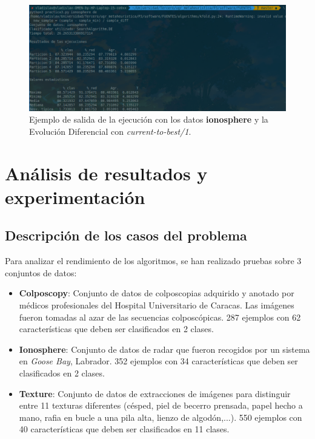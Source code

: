 \documentclass[11pt,a4paper]{article}
\begin{document}
\begin{figure}[H]
\centering
\includegraphics[scale=0.4]{img/out_example.png}
\caption{Ejemplo de salida de la ejecución con los datos \textbf{ionosphere} y la Evolución Diferencial con
\textit{current-to-best/1}.}
\end{figure}

\newpage

\section{Análisis de resultados y experimentación}

\subsection{Descripción de los casos del problema}

Para analizar el rendimiento de los algoritmos, se han realizado pruebas sobre 3 conjuntos de datos:

\begin{itemize}[label=\textbullet]
	\item \textbf{Colposcopy}: Conjunto de datos de colposcopias adquirido y anotado por médicos profesionales del Hospital
	Universitario de Caracas. Las imágenes fueron tomadas al azar de las secuencias colposcópicas. 287 ejemplos con 62
	características que deben ser clasificados en 2 clases.
	\item \textbf{Ionosphere}: Conjunto de datos de radar que fueron recogidos por un sistema en \textit{Goose Bay},
	Labrador. 352 ejemplos con 34 características que deben ser clasificados en 2 clases.
	\item \textbf{Texture}: Conjunto de datos de extracciones de imágenes para distinguir entre 11 texturas diferentes
	(césped, piel de becerro prensada, papel hecho a mano, rafia en bucle a una pila alta, lienzo de algodón,...). 550
	ejemplos con 40 características que deben ser clasificados en 11 clases.
\end{itemize}
\end{document}
